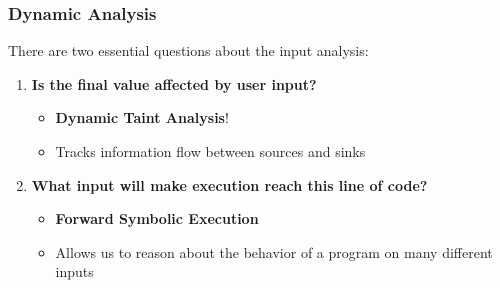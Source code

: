 \begin{frame}
	\frametitle{Dynamic Analysis}
	There are two essential questions about the input analysis: \newline
	\begin{enumerate}
		\item<2-> \textbf{Is the final value affected by user input?}
		\begin{itemize}
			\item \textbf{Dynamic Taint Analysis}!
			\item Tracks information flow between sources and sinks
		\end{itemize}
		\item<3-> \textbf{What input will make execution reach this line of code?}
		\begin{itemize}
			\item \textbf{Forward Symbolic Execution}
			\item Allows us to reason about the behavior of a program on many different inputs
		\end{itemize}
	\end{enumerate}
\end{frame}